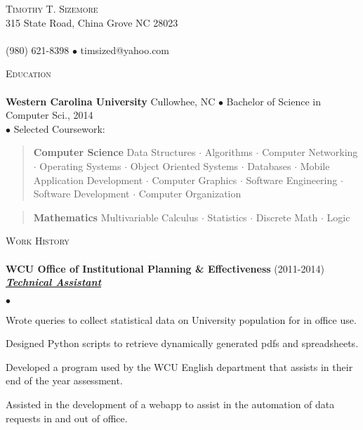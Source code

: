 \documentclass{article}
\newcommand{\area}[2]{\vspace*{-9pt} \begin{verse}\textbf{#1}   #2 \end{verse}  }
\newcommand{\lineunder}{\vspace*{-8pt} \\ \hspace*{-18pt} \hrulefill \\}
\newcommand{\header}[1]{{\hspace*{-15pt}\vspace*{6pt} \textsc{#1}} \vspace*{-6pt} \lineunder}
\newcommand{\employer}[3]{{ \textbf{#1} (#2)\\ \underline{\textbf{\emph{#3}}}\\  }}
\newcommand{\contact}[3]{
\vspace*{-8pt}
\begin{center}
{\LARGE \scshape {#1}}\\
#2 \lineunder 
#3
\end{center}
\vspace*{-8pt}
}
\newenvironment{achievements}{\begin{list}{$\bullet$}{\topsep 0pt \itemsep -2pt}}{\vspace*{4pt}\end{list}}
\newcommand{\schoolwithcourses}[4]{
 \textbf{#1} #2 $\bullet$ #3\\ 
#4 $\bullet$  Selected Coursework:\\
\vspace*{5pt}
}
\begin{document}
\small
\smallskip
\vspace*{-44pt}

\contact{Timothy T. Sizemore}
{315 State Road, China Grove NC 28023}
{(980) 621-8398 $\bullet$ timsized@yahoo.com}

\header{Education}

\schoolwithcourses{Western Carolina University}{Cullowhee, NC}{Bachelor of Science in Computer Sci., 2014}
    {}
    \area{Computer Science}{Data Structures $\cdot$ Algorithms $\cdot$ Computer Networking
    $\cdot$ Operating Systems $\cdot$ Object Oriented Systems $\cdot$ Databases $\cdot$ Mobile Application Development 
    $\cdot$ Computer Graphics $\cdot$ Software Engineering $\cdot$ Software Development $\cdot$ Computer Organization}
	\area{Mathematics}{Multivariable Calculus $\cdot$ Statistics $\cdot$ Discrete Math $\cdot$ Logic}

\header{Work History}
\employer{WCU Office of Institutional Planning \&
Effectiveness}{2011-2014}{Technical Assistant}
	\begin{achievements}
	\item Wrote queries to collect statistical data on University population for
        in office use.
	\item Designed Python scripts to retrieve dynamically generated pdfs and
        spreadsheets.
	\item Developed a program used by the WCU English department that assists in
        their end of the year assessment.
	\item Assisted in the development of a webapp to assist in the automation of
        data requests in and out of office.
	\end{achievements}
\end{document}
